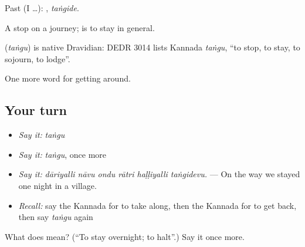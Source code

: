 Past (I …): , \emph{taṅgide}.

A stop on a journey;  is to stay in general.

\begin{cousinweb}
\textbf{} (\emph{taṅgu}) is native Dravidian: DEDR 3014 lists Kannada \emph{taṅgu}, \textquotedblleft{}to stop, to stay, to sojourn, to lodge\textquotedblright{}.
\end{cousinweb}

\begin{grammarlens}[title={What you've built}]
One more word for getting around.
\end{grammarlens}

\subsection*{Your turn}
\begin{itemize}
\raggedright
  \item \emph{Say it:} \emph{taṅgu}
  \item \emph{Say it:} \emph{taṅgu}, once more
  \item \emph{Say it:} \emph{dāriyalli nāvu ondu rātri haḷḷiyalli taṅgidevu.} — On the way we stayed one night in a village.
  \item \emph{Recall:} say the Kannada for to take along, then the Kannada for to get back, then say \emph{taṅgu} again
\end{itemize}

\begin{tcolorbox}[breakable,colback=teal!4,colframe=teal!35!black,title={Before you move on}]
What does  mean? (\textquotedblleft{}To stay overnight; to halt\textquotedblright{}.) Say it once more.
\end{tcolorbox}
